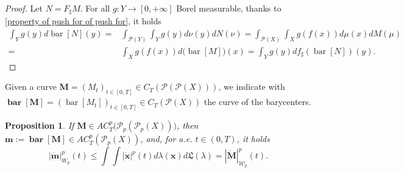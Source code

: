 \documentclass[10pt,leqno]{amsart}
\numberwithin{equation}{section}
\newtheorem{prop}[teorema]{Proposition}
\newcommand{\PP}{\mathcal{P}}
\begin{document}
\begin{proof}
    Let $N = F_\sharp M$. For all $g: Y \to [0,+\infty]$ Borel measurable, thanks to \eqref{property of push for of push for}, it holds
    \begin{align*}
        \int_Y g(y) d\operatorname{bar}[N](y) = & \int_{\PP(Y)} \int_Y g(y) d\nu(y) dN(\nu)
        =  
        \int_{\PP(X)} \int_X g(f(x)) d\mu(x) dM(\mu)
        \\
        = &
        \int_X g(f(x)) d\big(\operatorname{bar}[M]\big)(x) = \int_Y g(y) df_\sharp (\operatorname{bar}[N])(y).
        \end{align*}
\end{proof}

Given a curve $\boldsymbol{M} = (M_t)_{t\in [0,T]} \in C_T(\PP(\PP(X)))$, we indicate with $\boldsymbol{\operatorname{bar}[M]}= (\operatorname{bar}[M_t])_{t\in [0,T]} \in C_T(\PP(X))$ the curve of the barycenters.

\begin{prop}
    If $\boldsymbol{M}\in AC^p_T\big(\PP_p(\PP_p(X))\big)$, then $\boldsymbol{m}:=\boldsymbol{\operatorname{bar}[M]}\in AC^p_T(\PP_p(X))$, and, for a.e. $t\in(0,T)$, it holds
    \begin{equation}
        | \dot{\boldsymbol{m}} |_{W_p}^p(t) \leq \int \int |\dot{\boldsymbol{x}}|^p(t) d\lambda(\boldsymbol{x}) d\mathfrak{L}(\lambda) = |\dot{\boldsymbol{M}}|_{\mathcal{W}_p}^p(t).
    \end{equation}
\end{prop}
\end{document}
